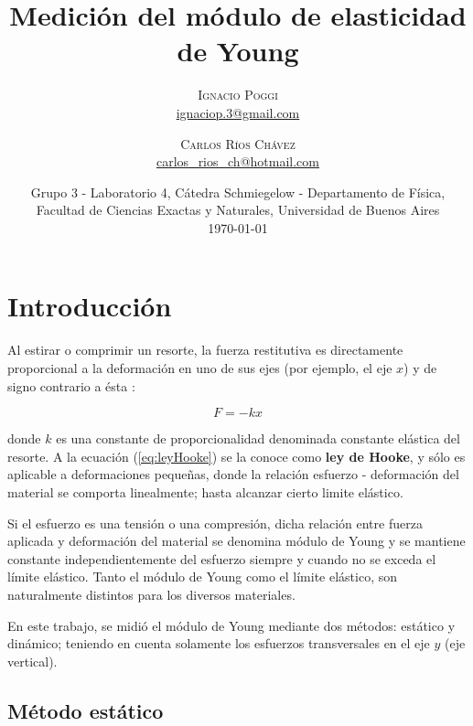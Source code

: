 \documentclass[twoside,twocolumn,a4paper]{article}
\title{Medici\'on del m\'odulo de elasticidad de Young} %
\author{%
\textsc{Ignacio Poggi} \\[1ex] %
\normalsize \href{mailto:ignaciop.3@gmail.com}{ignaciop.3@gmail.com} %
\and %
\textsc{Carlos R\'ios Ch\'avez} \\[1ex] %
\normalsize \href{mailto:carlos_rios_ch@hotmail.com}{carlos\_rios\_ch@hotmail.com} %
}
\date{Grupo 3 - Laboratorio 4, C\'atedra Schmiegelow - Departamento de F\'isica, Facultad de Ciencias Exactas y Naturales, Universidad de Buenos Aires \newline \\ \today} %
\begin{document}
\maketitle



\section{Introducci\'on}

Al estirar o comprimir un resorte, la fuerza restitutiva es directamente proporcional a la deformaci\'on en uno de sus ejes (por ejemplo, el eje $x$) y de signo contrario a \'esta \cite{eq:leyhooke}:

\begin{equation}
\label{eq:leyHooke}
F = -kx
\end{equation}

donde $k$ es una constante de proporcionalidad denominada constante el\'astica del resorte.
A la ecuaci\'on (\ref{eq:leyHooke}) se la conoce como \textbf{ley de Hooke}, y s\'olo es aplicable a deformaciones peque\~nas, donde la relaci\'on esfuerzo - deformaci\'on del material se comporta linealmente; hasta alcanzar cierto limite el\'astico. \newline

\par Si el esfuerzo es una tensi\'on o una compresi\'on, dicha relaci\'on entre fuerza aplicada y deformaci\'on del material se denomina m\'odulo de Young y se mantiene constante independientemente del esfuerzo siempre y cuando no se exceda el l\'imite el\'astico. Tanto el m\'odulo de Young como el l\'imite el\'astico, son naturalmente distintos para los diversos materiales. \newline

\par En este trabajo, se midi\'o el m\'odulo de Young mediante dos m\'etodos: est\'atico y din\'amico; teniendo en cuenta solamente los esfuerzos transversales en el eje $y$ (eje vertical). \newline

\subsection{M\'etodo est\'atico}
\end{document}
